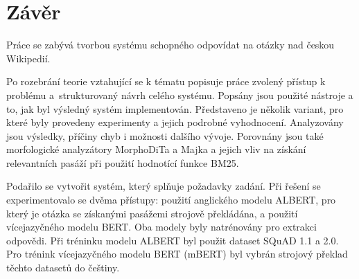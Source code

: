 
\chapter{Závěr}
\label{conclusion}
Práce se zabývá tvorbou systému schopného odpovídat na otázky nad českou Wikipedií.\par

Po rozebrání teorie vztahující se k tématu popisuje práce zvolený přístup k problému a~strukturovaný návrh celého systému. Popsány jsou použité nástroje a to, jak byl výsledný systém implementován. Představeno je několik variant, pro které byly provedeny experimenty a jejich podrobné vyhodnocení. Analyzovány jsou výsledky, příčiny chyb i možnosti dalšího vývoje. Porovnány jsou také morfologické analyzátory MorphoDiTa a Majka a jejich vliv na získání relevantních pasáží při použití hodnotící funkce BM25.\par
\smallskip

Podařilo se vytvořit systém, který splňuje požadavky zadání. Při řešení se experimentovalo se dvěma přístupy: použití anglického modelu ALBERT, pro který je otázka se získanými pasážemi strojově překládána, a použití vícejazyčného modelu BERT. Oba modely byly natrénovány pro extrakci odpovědi. Při tréninku modelu ALBERT byl použit dataset SQuAD 1.1 a 2.0. Pro trénink vícejazyčného modelu BERT (mBERT) byl vybrán strojový překlad těchto datasetů do češtiny.\par

